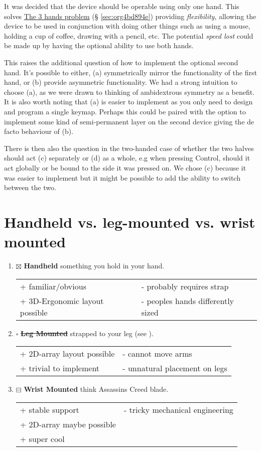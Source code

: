 \documentclass[logo,bsc,singlespacing,parskip]{infthesis}
\begin{document}
It was decided that the device should be operable using only one hand.
This solves \hyperref[sec:org4bd894e]{The 3 hands problem} (§ \ref{sec:org4bd894e}) providing \emph{flexibility}, allowing the device to be used in conjunction with doing other things such as using a mouse, holding a cup of coffee, drawing with a pencil, etc.
The potential \emph{speed lost} could be made up by having the optional ability to use both hands.

This raises the additional question of how to implement the optional second hand.
It's possible to either, (a) symmetrically mirror the functionality of the first hand, or (b) provide asymmetric functionality.
We had a strong intuition to choose (a), as we were drawn to thinking of ambidextrous symmetry as a benefit.
It is also worth noting that (a) is easier to implement as you only need to design and program a single keymap.
Perhaps this could be paired with the option to implement some kind of semi-permanent layer on the second device giving the de facto behaviour of (b).

There is then also the question in the two-handed case of whether the two halves should act (c) separately or (d) as a whole, e.g when pressing Control, should it act globally or be bound to the side it was pressed on.
We chose (c) because it was easier to implement but it might be possible to add the ability to switch between the two.
\section{Handheld vs. leg-mounted vs. wrist mounted}
\label{sec:org61979b5}
\begin{enumerate}
\item{$\boxtimes$} \textbf{Handheld} something you hold in your hand.
\begin{longtable}{|p{6.25cm}|p{6.25cm}|}
\hline
+ familiar/obvious & - probably requires strap\\
+ 3D-Ergonomic layout possible & - peoples hands differently sized\\
\hline
\end{longtable}
\item{$\square$} \sout{\textbf{Leg Mounted}} strapped to your leg (see \autocite{SimulaVR2021}).
\begin{longtable}{|p{6.25cm}|p{6.25cm}|}
\hline
+ 2D-array layout possible & - cannot move arms\\
+ trivial to implement & - unnatural placement on legs\\
\hline
\end{longtable}
\item{$\boxminus$} \textbf{Wrist Mounted} think Assassins Creed blade.
\begin{longtable}{|p{6.25cm}|p{6.25cm}|}
\hline
+ stable support & - tricky mechanical engineering\\
+ 2D-array maybe possible & \\
+ super cool & \\
\hline
\end{longtable}
\end{enumerate}
\end{document}
